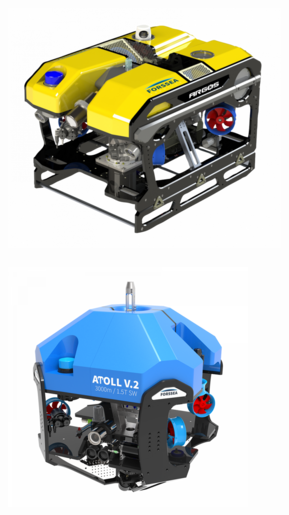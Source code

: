 			\begin{figure}[!htb]
				\centering
				\begin{subfigure}[b]{0.3\textwidth}
					\centering
					\includegraphics[width=\textwidth]{imgs/argos.png}
					\caption{\argos{}}
				\end{subfigure}
				\hfill
				\begin{subfigure}[b]{0.3\textwidth}
					\centering
					\includegraphics[width=\textwidth]{imgs/atoll.png}

\end{subfigure}
\end{figure}
